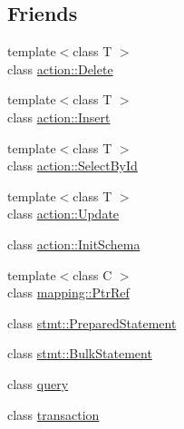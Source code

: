 \subsection*{Friends}
\begin{DoxyCompactItemize}
\item 
{\footnotesize template$<$class T $>$ }\\class \hyperlink{classdbo_1_1connection_ae779179e16547c9a93329dd197385493}{action\+::\+Delete}
\item 
{\footnotesize template$<$class T $>$ }\\class \hyperlink{classdbo_1_1connection_a88a9b73e2cb3304941371508b660e53e}{action\+::\+Insert}
\item 
{\footnotesize template$<$class T $>$ }\\class \hyperlink{classdbo_1_1connection_a8b98481706995f8b3e2665f74b2b3039}{action\+::\+Select\+By\+Id}
\item 
{\footnotesize template$<$class T $>$ }\\class \hyperlink{classdbo_1_1connection_a90af99826aea472a0aa22e59376fed0f}{action\+::\+Update}
\item 
class \hyperlink{classdbo_1_1connection_af0423915055bedb88a9d6d44bd6d7d86}{action\+::\+Init\+Schema}
\item 
{\footnotesize template$<$class C $>$ }\\class \hyperlink{classdbo_1_1connection_a1dfe637f2baf477f4a0579512df51cf6}{mapping\+::\+Ptr\+Ref}
\item 
class \hyperlink{classdbo_1_1connection_afb842ec251d7985ea41205c003c9b86e}{stmt\+::\+Prepared\+Statement}
\item 
class \hyperlink{classdbo_1_1connection_ac67430204a570dc3ecd9da0db836157d}{stmt\+::\+Bulk\+Statement}
\item 
class \hyperlink{classdbo_1_1connection_a7fddf73eaed86e45a2aacbd26b5af751}{query}
\item 
class \hyperlink{classdbo_1_1connection_ac6311258cbfe9139b0ca828a99e9ce04}{transaction}
\end{DoxyCompactItemize}


